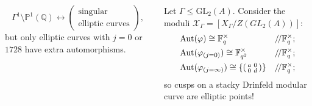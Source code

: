 \documentclass[handout]{beamer}
\numberwithin{equation}{section}
\numberwithin{case}{theorem}
\newcommand{\sX}{\mathscr{X}}		%
\newcommand{\bbF}{\mathbb{F}}		%
\newcommand{\bbP}{\mathbb{P}}		%
\newcommand{\bbQ}{\mathbb{Q}}		%
\newcommand{\GL}{\mathrm{GL}} 	%
\newcommand{\Aut}{\mathrm{Aut}} 	%
\newcommand{\<}{\left\langle}
\renewcommand{\>}{\right\rangle}
\begin{document}
\begin{frame}
\begin{columns}
\begin{column}{.5\textwidth}
				\pause
				\[\Gamma^1\setminus\bbP^1(\bbQ)\leftrightarrow\left(\begin{array}{c}\text{singular}\\\text{elliptic curves}\end{array}\right),\]
				but only elliptic curves with $j=0$ or $1728$ have extra automorphisms.
			\end{column}\pause
			\begin{column}{.5\textwidth}
				Let $\Gamma\leq \GL_2(A).$ Consider the moduli $\sX_{\Gamma}=[X_{\Gamma}/Z(GL_2(A))]:$ \pause
				\begin{align*}
					&\Aut(\varphi)\cong \bbF_q^{\times}& /\!/\bbF_q^{\times};\\ 
					&\Aut(\varphi_{(j=0)})\cong \bbF_{q^2}^{\times}& /\!/\bbF_q^{\times};\\ 
					&\Aut(\varphi_{(j=\infty)})\cong\{\begin{psmallmatrix}a&0\\0&d\end{psmallmatrix}\}&/\!/\bbF_q^{\times};
				\end{align*}
				so cusps on a stacky Drinfeld modular curve are elliptic points!
				
			\end{column}
		\end{columns}
	\end{frame}
	
\end{document}
